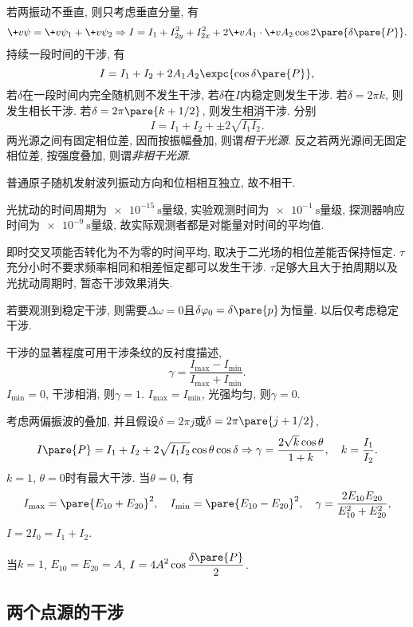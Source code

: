 \documentclass{ctexart}
\begin{document}
若两振动不垂直, 则只考虑垂直分量, 有
\[ \+v\psi = \+v\psi_1 + \+v\psi_2 \Rightarrow I = I_1  + I_{2y}^2 + I_{2x}^2 + 2\+vA_1\cdot\+vA_2 \cos2\pare{\delta\pare{P}}. \]
持续一段时间的干涉, 有
\[ I = I_1 + I_2 + 2A_1A_2 \expc{\cos\delta\pare{P}}, \]
若$\delta$在一段时间内完全随机则不发生干涉, 若$\delta$在$I$内稳定则发生干涉. 若$\delta = 2\pi k$, 则发生相长干涉. 若$\delta = 2\pi\pare{k+1/2}$, 则发生相消干涉. 分别
\[ I = I_1 + I_2 + \pm 2\sqrt{I_1I_2}. \]
两光源之间有固定相位差, 因而按振幅叠加, 则谓\emph{相干光源}. 反之若两光源间无固定相位差, 按强度叠加, 则谓\emph{非相干光源}.
\begin{ex}
    普通原子随机发射波列振动方向和位相相互独立, 故不相干.
\end{ex}
\par
光扰动的时间周期为$\SI{e-15}{\second}$量级, 实验观测时间为$\SI{e-1}{\second}$量级, 探测器响应时间为$\SI{e-9}{\second}$量级, 故实际观测者都是对能量对时间的平均值.
\par
即时交叉项能否转化为不为零的时间平均, 取决于二光场的相位差能否保持恒定. $\tau$充分小时不要求频率相同和相差恒定都可以发生干涉. $\tau$足够大且大于拍周期以及光扰动周期时, 暂态干涉效果消失.
\par
若要观测到稳定干涉, 则需要$\Delta \omega = 0$且$\delta\varphi_0 = \delta\pare{p}$为恒量. 以后仅考虑稳定干涉.
\par
干涉的显著程度可用干涉条纹的反衬度描述,
\[ \gamma = \frac{I_{\mathrm{max}} - I_{\mathrm{min}}}{I_{\mathrm{max}} + I_{\mathrm{min}}}. \]
$I_{\mathrm{min}}=0$, 干涉相消, 则$\gamma = 1$. $I_{\mathrm{max}} = I_{\mathrm{min}}$, 光强均匀, 则$\gamma = 0$.
\par
考虑两偏振波的叠加, 并且假设$\delta = 2\pi j$或$\delta = 2\pi \pare{j+1/2}$,
\[ I\pare{P} = I_1 + I_2 + 2\sqrt{I_1I_2} \cos\theta \cos\delta\Rightarrow \gamma = \frac{2\sqrt{k}\cos\theta}{1+k},\quad k = \frac{I_1}{I_2}. \]
$k=1$, $\theta=0$时有最大干涉. 当$\theta = 0$, 有
\[ I_{\mathrm{max}} = \pare{E_{10} + E_{20}}^2,\quad I_{\mathrm{min}} = \pare{E_{10} - E_{20}}^2,\quad \gamma = \frac{2E_{10}E_{20}}{E_{10}^2 + E_{20}^2}, \]
$I = 2I_0 = I_1 + I_2$.
\par
当$k=1$, $E_{10} = E_{20} = A$, $\displaystyle I = 4A^2 \cos \frac{\delta\pare{P}}{2}$.


\subsection{两个点源的干涉} %
\label{sub:两个点源的干涉}
\end{document}
